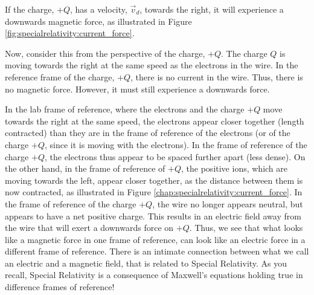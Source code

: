 If the charge, $+Q$, has a velocity, $\vec v_d$, towards the right, it will experience a downwards magnetic force, as illustrated in Figure \ref{fig:specialrelativity:current_force}.

Now, consider this from the perspective of the charge, $+Q$. The charge $Q$ is moving towards the right at the same speed as the electrons in the wire. In the reference frame of the charge, $+Q$, there is no current in the wire. Thus, there is no magnetic force. However, it must still experience a downwards force.

In the lab frame of reference, where the electrons and the charge $+Q$ move towards the right at the same speed, the electrons appear closer together (length contracted) than they are in the frame of reference of the electrons (or of the charge $+Q$, since it is moving with the electrons). In the frame of reference of the charge $+Q$, the electrons thus appear to be spaced further apart (less dense). On the other hand, in the frame of reference of $+Q$, the positive ions, which are moving towards the left, appear closer together, as the distance between them is now contracted, as illustrated in Figure \ref{chap:specialrelativity:current_force}.
In the frame of reference of the charge $+Q$, the wire no longer appears neutral, but appears to have a net positive charge. This results in an electric field away from the wire that will exert a downwards force on $+Q$. Thus, we see that what looks like a magnetic force in one frame of reference, can look like an electric force in a different frame of reference. There is an intimate connection between what we call an electric and a magnetic field, that is related to Special Relativity. As you recall, Special Relativity is a consequence of Maxwell's equations holding true in difference frames of reference!

